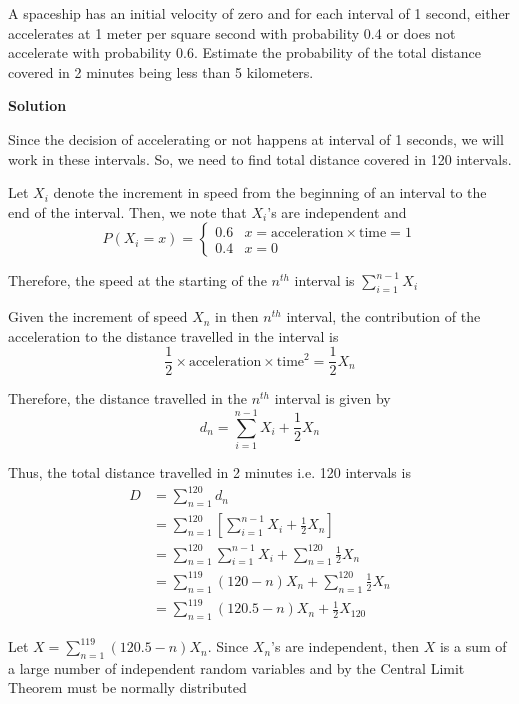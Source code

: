 \documentclass[12pt, oneside]{article}
\begin{document}
\begin{enumerate}
{    A spaceship has an initial velocity of zero and for each interval of 1 second,
    either accelerates at 1 meter per square second with probability 0.4 or does not 
    accelerate with probability 0.6. Estimate the probability of the total distance covered
    in 2 minutes being less than 5 kilometers.

    \textbf{Solution}

    Since the decision of accelerating or not happens at interval of 1 seconds, we will
    work in these intervals. So, we need to find total distance covered in 120 intervals.

    Let \(X_i\) denote the increment in speed from the beginning of an interval to the
    end of the interval. Then, we note that \(X_i\)'s are independent and 
    \[
        P(X_i = x) = \begin{cases}
                        0.6 & x = \text{acceleration} \times \text{time} = 1 \\
                        0.4 & x = 0
                     \end{cases}
    \]

    Therefore, the speed at the starting of the \(n^{th}\) interval is 
    \(\sum_{i=1}^{n-1} X_i\)

    Given the increment of speed \(X_n\) in then \(n^{th}\) interval, the contribution of the
    acceleration to the distance travelled in the interval is
    \[\frac{1}{2} \times \text{acceleration} \times \text{time}^2 = \frac{1}{2} X_n\]

    Therefore, the distance travelled in the \(n^{th}\) interval is given by
    \[
        d_n = \sum_{i=1}^{n-1} X_i + \frac{1}{2} X_n
    \]

    Thus, the total distance travelled in 2 minutes i.e. 120 intervals is
    \begin{align*}
        D &= \sum_{n = 1}^{120} d_n \\
          &= \sum_{n = 1}^{120} \left[\sum_{i=1}^{n-1} X_i + \frac{1}{2} X_n\right] \\
          &= \sum_{n = 1}^{120} \sum_{i=1}^{n-1} X_i + \sum_{n = 1}^{120} \frac{1}{2} X_n \\
          &= \sum_{n = 1}^{119} (120 - n) X_n + \sum_{n = 1}^{120} \frac{1}{2} X_n 
                          \tag*{(Expanding the double summation)} \\   
          &= \sum_{n = 1}^{119} (120.5 - n) X_n + \frac{1}{2}X_{120}
    \end{align*}

    Let \(X = \sum_{n = 1}^{119} (120.5 - n) X_n\). Since \(X_n\)'s are independent,
    then \(X\) is a sum of a large number of independent random variables and by the
    Central Limit Theorem must be normally distributed

}
\end{enumerate}
\end{document}
